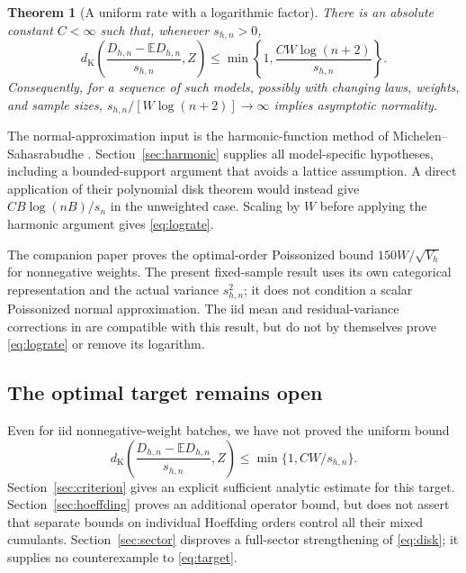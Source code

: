 \documentclass[11pt]{article}
\numberwithin{equation}{section}
\newtheorem{theorem}{Theorem}[section]
\theoremstyle{remark}\newtheorem{remark}[theorem]{Remark}
\newcommand{\E}{\mathbb E}\newcommand{\Pp}{\mathbb P}
\newcommand{\dK}{d_{\mathrm K}}\newcommand{\calZ}{\mathcal Z}
\begin{document}
\begin{theorem}[A uniform rate with a logarithmic factor]\label{thm:lograte}
There is an absolute constant $C<\infty$ such that, whenever $s_{h,n}>0$,
\begin{equation}\label{eq:lograte}
 \dK\left(\frac{D_{h,n}-\E D_{h,n}}{s_{h,n}},Z\right)
 \le \min\left\{1,\frac{CW\log(n+2)}{s_{h,n}}\right\}.
\end{equation}
Consequently, for a sequence of such models, possibly with changing laws,
weights, and sample sizes, $s_{h,n}/[W\log(n+2)]\to\infty$ implies
asymptotic normality.
\end{theorem}

The normal-approximation input is the harmonic-function method of
Michelen--Sahasrabudhe \cite[Lemma~4.1 and Corollary~9.3]{MS}.
Section~\ref{sec:harmonic} supplies all model-specific hypotheses, including
a bounded-support argument that avoids a lattice assumption. A direct
application of their polynomial disk theorem would instead give
$CB\log(nB)/s_n$ in the unweighted case. Scaling by $W$ before applying
the harmonic argument gives \eqref{eq:lograte}.

The companion paper \cite{LongOptimal} proves the optimal-order
Poissonized bound $150W/\sqrt{V_h}$ for nonnegative weights. The present
fixed-sample result uses its own categorical representation and the
actual variance $s_{h,n}^2$; it does not condition a scalar Poissonized
normal approximation. The iid mean and residual-variance corrections in
\cite[Section~7]{LongQuantitative} are compatible with this result, but
do not by themselves prove \eqref{eq:lograte} or remove its logarithm.

\subsection*{The optimal target remains open}
Even for iid nonnegative-weight batches, we have not proved the uniform
bound
\begin{equation}\label{eq:target}
 \dK\left(\frac{D_{h,n}-\E D_{h,n}}{s_{h,n}},Z\right)
 \le\min\{1,CW/s_{h,n}\}.
\end{equation}
Section~\ref{sec:criterion} gives an explicit sufficient analytic estimate
for this target. Section~\ref{sec:hoeffding} proves an additional
operator bound, but does not assert that separate bounds on individual
Hoeffding orders control all their mixed cumulants. Section~\ref{sec:sector}
disproves a full-sector strengthening of \eqref{eq:disk}; it supplies no
counterexample to \eqref{eq:target}.
\end{document}
